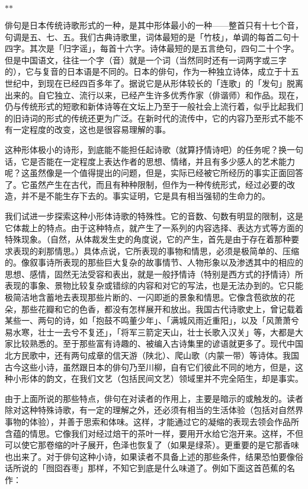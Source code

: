 {  \centerline{\hfill$*$\hfill$*$\hfill}

  俳句是日本传统诗歌形式的一种，是其中形体最小的一种——整首只有十七个音，句调是五、七、五。我们古典诗歌里，词体最短的是「竹枝」，单调的每首二句十四字。其次是「归字谣」，每首十六字。诗体最短的是五言绝句，四句二十个字。但是中国语文，往往一个字（音）就是一个词（当然同时还有一词两字或三字的），它与复音的日本语是不同的。日本的俳句，作为一种独立诗体，成立于十五世纪中，到现在已经四百多年了。据说它是从形体较长的「连歌」的「发句」脱离出来的。自它独立、流行以来，已经产生许多优秀作家（俳谐师）和作品。现在，仍与传统形式的短歌和新体诗等在文坛上乃至于一般社会上流行着，似乎比起我们的旧诗词的形式的传统还更为广泛。在新时代的流传中，它的内容乃至形式不能不有一定程度的改变，这也是很容易理解的事。

  这种形体极小的诗形，到底能不能担任起诗歌（就算抒情诗吧）的任务呢？换一句话，它是否能在一定程度上表达作者的思想、情绪，并且有多少感人的艺术能力呢？这虽然像是一个值得提出的问题，但是，实际已经被它所经历的事实正面回答了。它虽然产生在古代，而且有种种限制，但作为一种传统形式，经过必要的改造，并不是不能生存下去的。事实证明，它是具有相当强韧的生命力的。

  我们试进一步探索这种小形体诗歌的特殊性。它的音数、句数有明显的限制，这是它体裁上的特点。由于这种特点，就产生了一系列的内容选择、表达方式等方面的特殊现象。（自然，从体裁发生史的角度说，它的产生，首先是由于存在着那种要求表现的刹那情思。）具体点说，它所表现的事物和情思，必须是极简单的、压缩的。像叙事诗所表现的那些巨大复杂的故事情节、人物形象以及渗透其中的相应的思想、感情，固然无法受容和表出，就是一般抒情诗（特别是西方式的抒情诗）所表现的事象、景物比较复杂或错综的内容和对它的写法，也是无法办到的。它只能极简洁地含蓄地去表现那些片断的、一闪即逝的景象和情思。它像含苞欲放的花朵，那些花瓣和它的色香，都没有怎样展开和放出。我国古代诗歌史上，曾记载着某些一、两句的诗，如「抱鼓不鸣董少年」、「满城风雨近重阳」，以及「风萧萧兮易水寒，壮士一去兮不复还」，「将军三箭定天山，壮士长歌入汉关」等，大都是大家比较熟悉的。至于那些富有诗趣的、被编入古诗集里的谚语就更多了。现代中国北方民歌中，还有两句成章的信天游（陕北）、爬山歌（内蒙一带）等诗体。我国古今这些小诗，虽然跟日本的俳句乃至川柳，自有它们彼此不同的地方，但是，这种小形体的韵文，在我们文艺（包括民间文艺）领域里并不完全陌生，却是事实。

  由于上面所说的那些特点，俳句在对读者的作用上，主要是暗示的或触发的。读者除对这种特殊诗歌，有一定的理解之外，还必须有相当的生活体验（包括对自然界事物的体验），并善于思索和体味。这样，才能通过它的凝缩的表现去领会作品所含蕴的情思。它像我们对经过焙干的茶叶一样，要用开水给它泡开来。这样，不但可以使它那卷缩的叶子展开，色泽也恢复了（如果是绿茶）。更重要的是它那香味也出来了。对于俳句这种小诗，如果读者不具备上述的那些条件，结果恐怕要像俗话所说的「囫囵吞枣」那样，不知它到底是什么味道了。例如下面这首芭蕉的名作：

}
